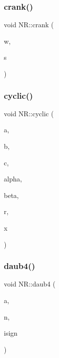 \subsubsection{\texorpdfstring{crank()}{crank()}}
{\footnotesize\ttfamily void N\+R\+::crank (\begin{DoxyParamCaption}\item[{\mbox{\hyperlink{namespaceNR_ab293e06a6bf799d8a7ed932b6852bcb8}{Vec\+\_\+\+I\+O\+\_\+\+DP}} \&}]{w,  }\item[{\mbox{\hyperlink{namespaceNR_af6ff762dd605ff477b8e52387253a02a}{DP}} \&}]{s }\end{DoxyParamCaption})}

\mbox{\label{namespaceNR_abe6af2a0141e9c645da6b86e995dfe82}} 
\subsubsection{\texorpdfstring{cyclic()}{cyclic()}}
{\footnotesize\ttfamily void N\+R\+::cyclic (\begin{DoxyParamCaption}\item[{\mbox{\hyperlink{namespaceNR_a9f943da53862537c552e2a770cb170ae}{Vec\+\_\+\+I\+\_\+\+DP}} \&}]{a,  }\item[{\mbox{\hyperlink{namespaceNR_a9f943da53862537c552e2a770cb170ae}{Vec\+\_\+\+I\+\_\+\+DP}} \&}]{b,  }\item[{\mbox{\hyperlink{namespaceNR_a9f943da53862537c552e2a770cb170ae}{Vec\+\_\+\+I\+\_\+\+DP}} \&}]{c,  }\item[{const \mbox{\hyperlink{namespaceNR_af6ff762dd605ff477b8e52387253a02a}{DP}}}]{alpha,  }\item[{const \mbox{\hyperlink{namespaceNR_af6ff762dd605ff477b8e52387253a02a}{DP}}}]{beta,  }\item[{\mbox{\hyperlink{namespaceNR_a9f943da53862537c552e2a770cb170ae}{Vec\+\_\+\+I\+\_\+\+DP}} \&}]{r,  }\item[{\mbox{\hyperlink{namespaceNR_a970094d23441f8ef6a45282a7eb2103d}{Vec\+\_\+\+O\+\_\+\+DP}} \&}]{x }\end{DoxyParamCaption})}

\mbox{\label{namespaceNR_afb5a6ee4e921ad8ae733cd25c9178abf}} 
\subsubsection{\texorpdfstring{daub4()}{daub4()}}
{\footnotesize\ttfamily void N\+R\+::daub4 (\begin{DoxyParamCaption}\item[{\mbox{\hyperlink{namespaceNR_ab293e06a6bf799d8a7ed932b6852bcb8}{Vec\+\_\+\+I\+O\+\_\+\+DP}} \&}]{a,  }\item[{const int}]{n,  }\item[{const int}]{isign }\end{DoxyParamCaption})}

